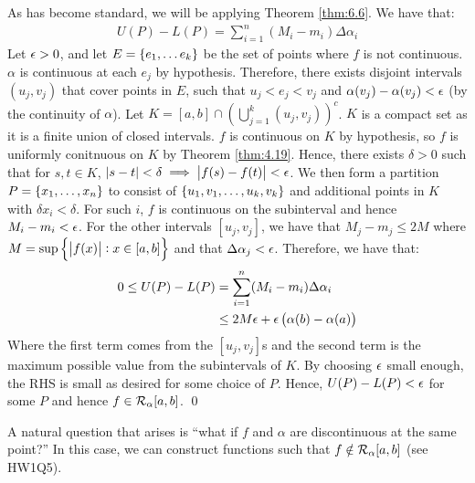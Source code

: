 \begin{nproof}
    As has become standard, we will be applying Theorem \ref{thm:6.6}. We have that:
    \begin{align*}
        U(P) - L(P) = \sum_{i=1}^n (M_i - m_i)\Delta \alpha_i
    \end{align*}
    Let $\epsilon > 0$, and let $E = \set{e_1, \ldots e_k}$ be the set of points where $f$ is not continuous. $\alpha$ is continuous at each $e_j$ by hypothesis. Therefore, there exists disjoint intervals $(u_j, v_j)$ that cover points in $E$, such that $u_j < e_j < v_j$ and $\alpha(v_j) - \alpha(v_j) < \epsilon$ (by the continuity of $\alpha$). Let $K = [a, b] \cap \left(\bigcup_{j=1}^k (u_j, v_j)\right)^c$. $K$ is a compact set as it is a finite union of closed intervals. $f$ is continuous on $K$ by hypothesis, so $f$ is uniformly conitnuous on $K$ by Theorem \ref{thm:4.19}. Hence, there exists $\delta > 0$ such that for $s, t \in K$, $\abs{s - t} < \delta \implies \abs{f(s) - f(t)} < \epsilon$. We then form a partition $P = \set{x_1, \ldots, x_n}$ to consist of $\set{u_1, v_1, \ldots, u_k, v_k}$ and additional points in $K$ with $\delta x_i < \delta$. For such $i$, $f$ is continuous on the subinterval and hence $M_i - m_i < \epsilon$. For the other intervals $[u_j, v_j]$, we have that $M_j - m_j \leq 2M$ where $M = \sup\set{\abs{f(x)}: x \in [a, b]}$ and that $\Delta \alpha_j < \epsilon$. Therefore, we have that:
    \begin{align*}
        0 \leq U(P) - L(P) &= \sum_{i=1}^n (M_i - m_i)\Delta \alpha_i
        \\ &\leq 2M\epsilon + \epsilon\left(\alpha(b) - \alpha(a)\right)
    \end{align*}
    Where the first term comes from the $[u_j, v_j]$s and the second term is the maximum possible value from the subintervals of $K$. By choosing $\epsilon$ small enough, the RHS is small as desired for some choice of $P$. Hence, $U(P) - L(P) < \epsilon$ for some $P$ and hence $f \in \mathcal{R}_\alpha[a, b]$. \qed
\end{nproof}
A natural question that arises is ``what if $f$ and $\alpha$ are discontinuous at the same point?'' In this case, we can construct functions such that $f \notin \mathcal{R}_\alpha[a, b]$ (see HW1Q5).
